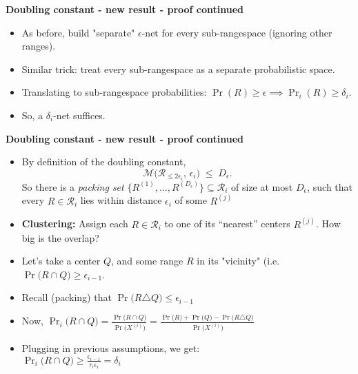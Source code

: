 \documentclass{beamer}
\begin{document}
\begin{frame}{\textbf{Doubling constant - new result - proof continued}}
  \begin{itemize}
    \item As before, build "separate" \( \epsilon\text{-net}\) for every sub-rangespace (ignoring other ranges).
    \item Similar trick: treat every sub-rangespace as a separate probabilistic space.
    \item Translating to sub-rangespace probabilities:
          \( \Pr(R) \ge \epsilon \implies \Pr_i(R) \ge \delta_i\).
    \item So, a \( \delta_i\)\!-net suffices.
  \end{itemize}
\end{frame}

\begin{frame}{\textbf{Doubling constant - new result - proof continued}}
  \begin{itemize}
    \item By definition of the doubling constant,
      \[
        \mathcal{M}\bigl(\mathcal{R}_{\le 2\epsilon_i},\,\epsilon_i\bigr)
        \;\le\; D_{\epsilon}.
      \]
      So there is a \emph{packing set}
      \(\{R^{(1)},\dots,R^{(D_\epsilon)}\}\subseteq \mathcal{R}_i\)
      of size at most \(D_\epsilon\), such that every
      \(R\in\mathcal{R}_i\) lies within distance \(\epsilon_i\) of some
      \(R^{(j)}\)
    \item \textbf{Clustering:}  Assign each \(R\in\mathcal{R}_i\)
      to one of its “nearest” centers \(R^{(j)}\). How big is the overlap?
      \item Let's take a center $Q$, and some range $R$ in its "vicinity" (i.e. $\Pr \bigl(R \cap Q \bigr) \geq \epsilon_{i-1}$.
      \item Recall (packing) that $\Pr \bigl (R \triangle Q\bigr ) \leq \epsilon_{i-1}$
      \item Now, \( \Pr_i \bigl(R \cap Q \bigr) = \frac{\Pr \bigl (R \cap Q \bigr)}{\Pr \bigl( X^{(i)} \bigr)} =\frac { \Pr \bigl(R \bigr) + \Pr \bigl (Q \bigr ) - \Pr \bigl( R \triangle Q \bigr) }{\Pr \bigl (X^{(i)} \bigr)} \)
      \item Plugging in previous assumptions, we get:\\
      \( \Pr_i \bigl(R \cap Q\bigr) \geq \frac{\epsilon_{i-1}}{\tau_i \epsilon_i} = \delta_i\)
      \end{itemize}
      
\end{frame}
\end{document}
